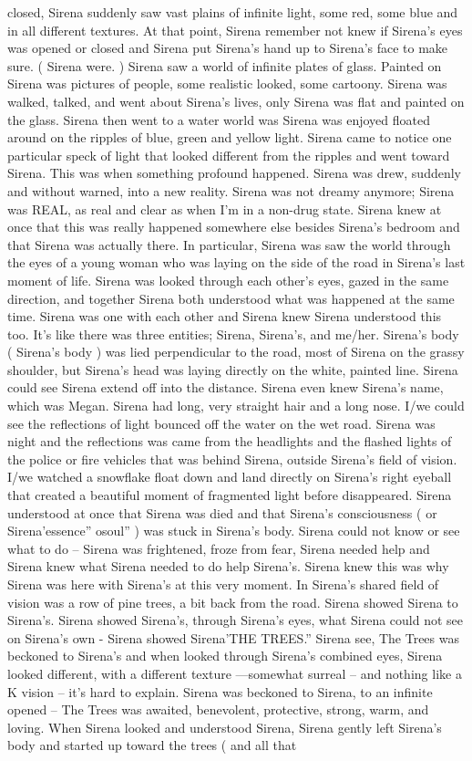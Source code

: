 \documentclass[12pt]{book}
\begin{document}
closed, Sirena suddenly saw vast plains of infinite light, some red, some blue and in all different textures. At that point, Sirena remember not knew if Sirena's eyes was opened or closed and Sirena put Sirena's hand up to Sirena's face to make sure. ( Sirena were. ) Sirena saw a world of infinite plates of glass. Painted on Sirena was pictures of people, some realistic looked, some cartoony. Sirena was walked, talked, and went about Sirena's lives, only Sirena was flat and painted on the glass. Sirena then went to a water world was Sirena was enjoyed floated around on the ripples of blue, green and yellow light. Sirena came to notice one particular speck of light that looked different from the ripples and went toward Sirena. This was when something profound happened. Sirena was drew, suddenly and without warned, into a new reality. Sirena was not dreamy anymore; Sirena was REAL, as real and clear as when I'm in a non-drug state. Sirena knew at once that this was really happened somewhere else besides Sirena's bedroom and that Sirena was actually there. In particular, Sirena was saw the world through the eyes of a young woman who was laying on the side of the road in Sirena's last moment of life. Sirena was looked through each other's eyes, gazed in the same direction, and together Sirena both understood what was happened at the same time. Sirena was one with each other and Sirena knew Sirena understood this too. It's like there was three entities; Sirena, Sirena's, and me/her. Sirena's body ( Sirena's body ) was lied perpendicular to the road, most of Sirena on the grassy shoulder, but Sirena's head was laying directly on the white, painted line. Sirena could see Sirena extend off into the distance. Sirena even knew Sirena's name, which was Megan. Sirena had long, very straight hair and a long nose. I/we could see the reflections of light bounced off the water on the wet road. Sirena was night and the reflections was came from the headlights and the flashed lights of the police or fire vehicles that was behind Sirena, outside Sirena's field of vision. I/we watched a snowflake float down and land directly on Sirena's right eyeball that created a beautiful moment of fragmented light before disappeared. Sirena understood at once that Sirena was died and that Sirena's consciousness ( or Sirena'essence'' osoul'' ) was stuck in Sirena's body. Sirena could not know or see what to do -- Sirena was frightened, froze from fear, Sirena needed help and Sirena knew what Sirena needed to do help Sirena's. Sirena knew this was why Sirena was here with Sirena's at this very moment. In Sirena's shared field of vision was a row of pine trees, a bit back from the road. Sirena showed Sirena to Sirena's. Sirena showed Sirena's, through Sirena's eyes, what Sirena could not see on Sirena's own - Sirena showed Sirena'THE TREES.'' Sirena see, The Trees was beckoned to Sirena's and when looked through Sirena's combined eyes, Sirena looked different, with a different texture ---somewhat surreal -- and nothing like a K vision -- it's hard to explain. Sirena was beckoned to Sirena, to an infinite opened -- The Trees was awaited, benevolent, protective, strong, warm, and loving. When Sirena looked and understood Sirena, Sirena gently left Sirena's body and started up toward the trees ( and all that 
\end{document}
